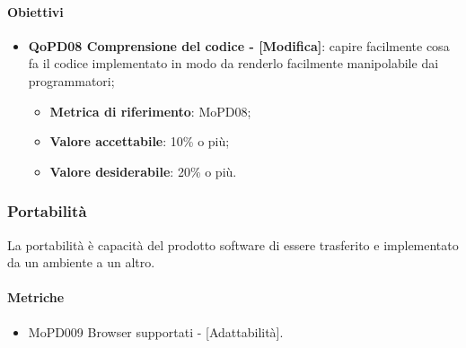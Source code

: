\documentclass[../piano-di-qualifica.tex]{subfiles}
\begin{document}
\paragraph{Obiettivi}
\label{sub:obiettivi}
\begin{itemize}
    \item \textbf{QoPD08 Comprensione del codice - [Modifica]}: capire facilmente cosa fa il codice implementato in modo da renderlo facilmente manipolabile dai programmatori;
        \begin{itemize}
            \item \textbf{Metrica di riferimento}: MoPD08;
            \item \textbf{Valore accettabile}: 10\% o più;
            \item \textbf{Valore desiderabile}: 20\% o più.
        \end{itemize}
\end{itemize}


\subsubsection{Portabilità}%
\label{sub:portabilita}
La portabilità è capacità del prodotto software di essere trasferito e implementato da un ambiente a un altro.

\paragraph{Metriche}
\label{sub:metriche}
\begin{itemize}
    \item MoPD009 Browser supportati - [Adattabilità].
\end{itemize}
\end{document}
